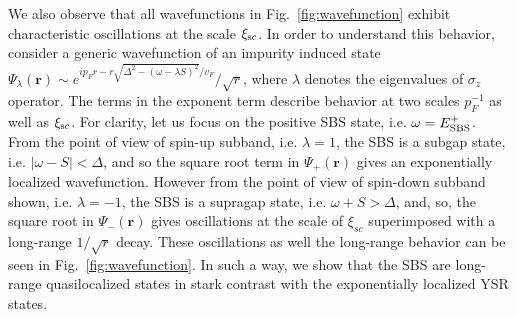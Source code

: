 \documentclass[twocolumn,showpacs,floatfix,longbibliography]{revtex4-1}
\begin{document}
We also observe that all wavefunctions in Fig.~\ref{fig:wavefunction} exhibit characteristic oscillations at the scale $\xi_{\rm sc}$. In order to understand this behavior, consider a generic wavefunction of an impurity induced state ${\Psi_\lambda(\bm r) \sim e^{ip_Fr-r\sqrt{\Delta^2-(\omega - \lambda S)^2}/v_F}/\sqrt{r}}$, where $\lambda$ denotes the eigenvalues of $\sigma_z$ operator. The terms in the exponent term describe behavior at two scales $p_F^{-1}$ as well as $\xi_{\rm sc}$. For clarity, let us focus on the positive SBS state, i.e. $\omega = E^{+}_{\rm SBS}$. From the point of view of spin-up subband, i.e. $\lambda = 1$, the SBS is a subgap state, i.e. $|\omega- S|<\Delta$, and so the square root term in $\Psi_+(\bm r)$ gives an exponentially localized wavefunction. However from the point of view of spin-down subband shown, i.e. $\lambda = -1$, the SBS is a supragap state, i.e. $\omega+S>\Delta$, and, so, the square root in $\Psi_-(\bm r)$ gives oscillations  at the scale of $\xi_{sc}$ superimposed with a long-range $1/\sqrt{r}$ decay. These oscillations as well the long-range behavior can be seen in Fig.~\ref{fig:wavefunction}. In such a way, we show that the SBS are long-range quasilocalized states in stark contrast with the exponentially localized YSR states.
\end{document}
